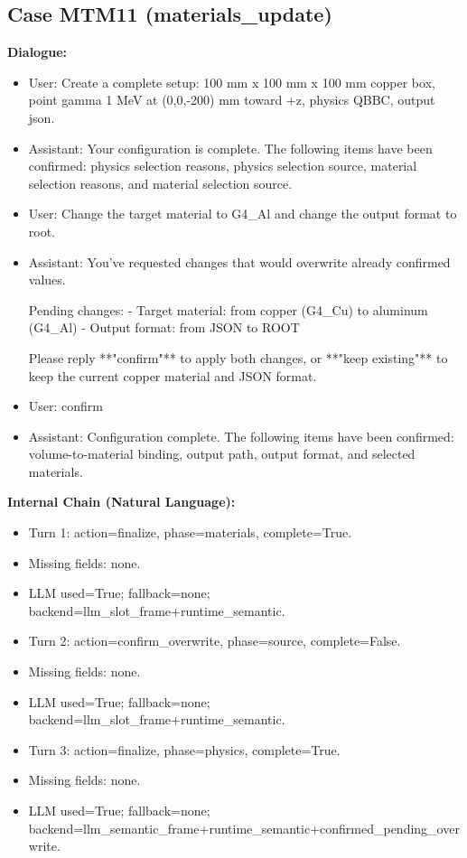 \documentclass[11pt]{ctexart}
\begin{document}
\subsection{Case MTM11 (materials\_update)}
\textbf{Dialogue:}
\begin{itemize}
\item User: Create a complete setup: 100 mm x 100 mm x 100 mm copper box, point gamma 1 MeV at (0,0,-200) mm toward +z, physics QBBC, output json.
\item Assistant: Your configuration is complete. The following items have been confirmed: physics selection reasons, physics selection source, material selection reasons, and material selection source.
\item User: Change the target material to G4\_Al and change the output format to root.
\item Assistant: You've requested changes that would overwrite already confirmed values.

Pending changes:
- Target material: from copper (G4\_Cu) to aluminum (G4\_Al)
- Output format: from JSON to ROOT

Please reply **"confirm"** to apply both changes, or **"keep existing"** to keep the current copper material and JSON format.
\item User: confirm
\item Assistant: Configuration complete. The following items have been confirmed: volume-to-material binding, output path, output format, and selected materials.
\end{itemize}
\textbf{Internal Chain (Natural Language):}
\begin{itemize}
\item Turn 1: action=finalize, phase=materials, complete=True.
\item Missing fields: none.
\item LLM used=True; fallback=none; backend=llm\_slot\_frame+runtime\_semantic.
\item Turn 2: action=confirm\_overwrite, phase=source, complete=False.
\item Missing fields: none.
\item LLM used=True; fallback=none; backend=llm\_slot\_frame+runtime\_semantic.
\item Turn 3: action=finalize, phase=physics, complete=True.
\item Missing fields: none.
\item LLM used=True; fallback=none; backend=llm\_semantic\_frame+runtime\_semantic+confirmed\_pending\_overwrite.
\end{itemize}
\end{document}
